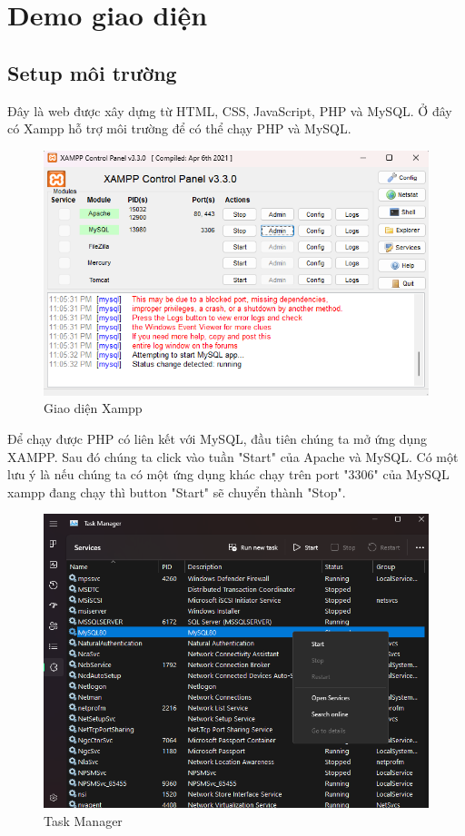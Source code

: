 \section{Demo giao diện}
\subsection{Setup môi trường}
Đây là web được xây dựng từ HTML, CSS, JavaScript, PHP và MySQL. Ở đây có Xampp hỗ trợ môi trường để có thể chạy PHP và MySQL.

\begin{figure}[H]
    \centering
    \includegraphics[scale=0.8]{images/xampp.png}
    \caption{Giao diện Xampp}
\end{figure}

Để chạy được PHP có liên kết với MySQL, đầu tiên chúng ta mở ứng dụng XAMPP. Sau đó chúng ta click vào tuần "Start" của Apache và MySQL. Có một lưu ý là nếu chúng ta có một ứng dụng khác chạy trên port "3306" của MySQL xampp đang chạy thì button "Start" sẽ chuyển thành "Stop".

\begin{figure}[H]
    \centering
    \includegraphics[scale=0.8]{images/taskManager.png}
    \caption{Task Manager}
\end{figure}

